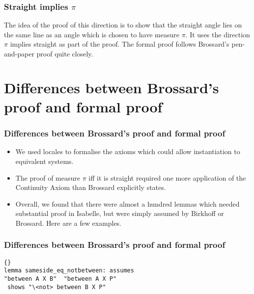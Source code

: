 \documentclass{beamer}
\begin{document}
{{{{{{\graphicspath{{/Users/Imogen/Desktop/Birkhoff_Presentation/}}
\begin{frame}
\frametitle{Straight implies $\pi$}
 \vfill
 
 \bigskip
 
 \bigskip
 
 \bigskip
 
 \bigskip
  
 \bigskip
 
 \bigskip
 
 \bigskip
 
The idea of the proof of this direction is to show that the straight angle lies on the same line as an angle which is chosen to have measure $\pi$. It uses the direction $\pi$ implies straight as part of the proof. The formal proof follows Brossard's pen-and-paper proof quite closely.
 
\end{frame}
}
\section{Differences between Brossard's proof and formal proof}
\begin{frame}[fragile]
\frametitle{Differences between Brossard's proof and formal proof}
 \begin{itemize}
 \item We used locales to formalise the axioms which could allow instantiation to equivalent systems.
 
\item The proof of measure $\pi$ iff it is straight required one more application of the Continuity Axiom than Brossard explicitly states.

\item Overall, we found that there were almost a hundred lemmas which needed substantial proof in Isabelle, but were simply assumed by Birkhoff or Brossard. Here are a few examples. 
\end{itemize}
\end{frame}

\begin{frame}[fragile]
\frametitle{Differences between Brossard's proof and formal proof}

 \begin{lstlisting}[language=Isar, mathescape = true]{}    
lemma sameside_eq_notbetween: assumes 
"between A X B"  "between A X P" 
 shows "\<not> between B X P"
\end{lstlisting}


\end{frame}}}}}}
\end{document}
